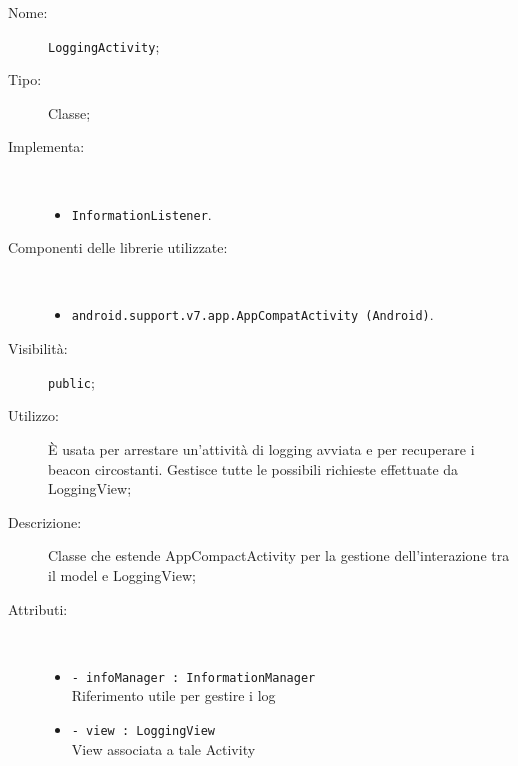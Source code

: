 \documentclass[../DefinizioneDiProdotto.tex]{subfiles}
\begin{document}
\begin{description}
	\item[Nome:] \texttt{LoggingActivity};
	\item[Tipo:] Classe;
	\item[Implementa:] \
	\begin{itemize}
		\item \texttt{InformationListener}.
		
	\end{itemize}
	\item[Componenti delle librerie utilizzate:] \
	\begin{itemize}
		\item \texttt{android.support.v7.app.AppCompatActivity (Android)}.
		
	\end{itemize}
	\item[Visibilità:] \texttt{public};
	\item[Utilizzo:] È usata per arrestare un'attività di logging avviata e per recuperare i beacon circostanti. Gestisce tutte le possibili richieste effettuate da LoggingView;
	\item[Descrizione:] Classe che estende AppCompactActivity per la gestione dell'interazione tra il model e LoggingView;
	\item[Attributi:] \
	\begin{itemize}
		\item \texttt{- infoManager : InformationManager}\\
		Riferimento utile per gestire i log
		
		\item \texttt{- view : LoggingView}\\
		View associata a tale Activity
		

\end{itemize}
\end{description}
\end{document}
